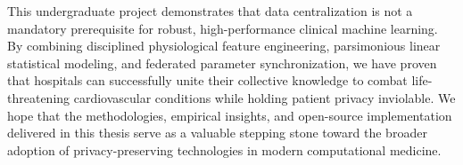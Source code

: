 This undergraduate project demonstrates that data centralization is not a mandatory prerequisite for robust, high-performance clinical machine learning. By combining disciplined physiological feature engineering, parsimonious linear statistical modeling, and federated parameter synchronization, we have proven that hospitals can successfully unite their collective knowledge to combat life-threatening cardiovascular conditions while holding patient privacy inviolable. We hope that the methodologies, empirical insights, and open-source implementation delivered in this thesis serve as a valuable stepping stone toward the broader adoption of privacy-preserving technologies in modern computational medicine.

